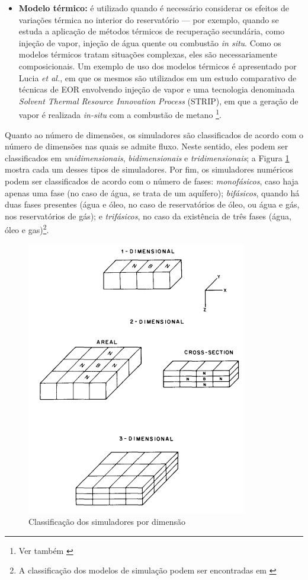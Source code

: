 \begin{itemize}
	\item \textbf{Modelo t\'{e}rmico:} \'{e} utilizado quando \'{e} necess\'{a}rio considerar os efeitos de varia\c{c}\~{o}es t\'{e}rmica no interior do reservat\'{o}rio --- por exemplo, quando se estuda a aplica\c{c}\~{a}o de m\'{e}todos t\'{e}rmicos de recupera\c{c}\~{a}o secund\'{a}ria, como inje\c{c}\~{a}o de vapor, inje\c{c}\~{a}o de \'{a}gua quente ou combust\~{a}o \textit{in situ}. Como os modelos t\'{e}rmicos tratam situa\c{c}\~{o}es complexas, eles s\~{a}o necessariamente composicionais. Um exemplo de uso dos modelos t\'{e}rmicos \'{e} apresentado por Lucia \textit{et al.}, em que os mesmos s\~{a}o utilizados em um estudo comparativo de t\'{e}cnicas de EOR envolvendo inje\c{c}\~{a}o de vapor e uma tecnologia denominada \textit{Solvent Thermal Resource Innovation Process} (STRIP), em que a gera\c{c}\~{a}o de vapor \'{e} realizada \textit{in-situ} com a combust\~{a}o de metano \cite{luciaetal}\footnote{Ver tamb\'{e}m \cite{ZAYDULLIN201451}}.
\end{itemize}

Quanto ao n\'{u}mero de dimens\~{o}es, os simuladores s\~{a}o classificados de acordo com o n\'{u}mero de dimens\~{o}es nas quais se admite fluxo. Neste sentido, eles podem ser classificados em \textit{unidimensionais}, \textit{bidimensionais} e \textit{tridimensionais}; a Figura \ref{fig:revisao_DIM} mostra cada um desses tipos de simuladores. Por fim, os simuladores num\'{e}ricos podem ser classificados de acordo com o n\'{u}mero de fases: \textit{monof\'{a}sicos}, caso haja apenas uma fase (no caso de \'{a}gua, se trata de um aqu\'{i}fero); \textit{bif\'{a}sicos}, quando h\'{a} duas fases presentes (\'{a}gua e \'{o}leo, no caso de reservat\'{o}rios de \'{o}leo, ou \'{a}gua e g\'{a}s, nos reservat\'{o}rios de g\'{a}s); e \textit{trif\'{a}sicos}, no caso da exist\^{e}ncia de tr\^{e}s fases (\'{a}gua, \'{o}leo e gas)\footnote{A classifica\c{c}\~{a}o dos modelos de simula\c{c}\~{a}o podem ser encontradas em \cite[pp. 517--519]{engres}}.

\begin{figure}[!ht]
	\centering
	\includegraphics[width=.6\textwidth]{figs/revisao/revisao_DIM}
	\caption{Classifica\c{c}\~{a}o dos simuladores por dimens\~{a}o \cite{coats1982} \label{fig:revisao_DIM}}
\end{figure}

